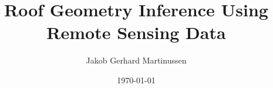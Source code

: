 \documentclass[american]{ntnuthesis}
\title{Roof Geometry Inference Using Remote Sensing Data}
\author{Jakob Gerhard Martinussen}
\date{\today}
\begin{document}
\setcounter{page}{3}

\begin{titlepage}
  \maketitle
\end{titlepage}




\tableofcontents
\listoffigures
\listoftables





\printbibliography

\appendix

\end{document}
